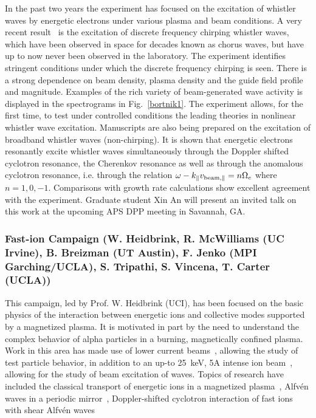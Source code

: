 \documentclass[11pt]{article}
\renewcommand{\cite}{\citep}
\begin{document}
In the past two years the experiment has focused on the excitation of
whistler waves by energetic electrons under various plasma and beam
conditions. A very recent result~\cite{vancompernolle:2015a} is the excitation
of discrete frequency chirping whistler waves, which have been observed
in space for decades known as chorus waves, but have up to now never
been observed in the laboratory. The experiment identifies stringent
conditions under which the discrete frequency chirping is seen. There is
a strong dependence on beam density, plasma density and the guide field
profile and magnitude. Examples of the rich variety of beam-generated
wave activity is displayed in the spectrograms in Fig.~\ref{bortnik1}. The
experiment allows, for the first time, to test under controlled
conditions the leading theories in nonlinear whistler wave excitation.
Manuscripts are also being prepared on the excitation of broadband
whistler waves (non-chirping). It is shown that energetic electrons
resonantly excite whistler waves simultaneously through the Doppler
shifted cyclotron resonance, the Cherenkov resonance as well as through
the anomalous cyclotron resonance, i.e. through the relation $\omega -
k_\parallel v_{{\rm beam}, \parallel} = n\Omega_{e}$ where
$n=1,0,-1$. Comparisons with
growth rate calculations show excellent agreement with the
experiment.  Graduate student Xin An will present an invited talk on
this work at the upcoming APS DPP meeting in Savannah, GA.

\subsubsection{Fast-ion Campaign (W. Heidbrink, R. McWilliams (UC Irvine), B.
Breizman (UT Austin), F. Jenko (MPI Garching/UCLA), S. Tripathi, S.
Vincena, T. Carter (UCLA))}

This campaign, led by Prof. W. Heidbrink (UCI), has been focused on the basic
physics of the interaction between energetic ions and collective modes
supported by a magnetized plasma. It is motivated in part by the need to
understand the complex behavior of alpha particles in a burning,
magnetically confined plasma.  Work in this area has made use of lower
current beams~\cite{zhang:2007}, allowing the study of test particle behavior, in
addition to an up-to 25~keV, 5A intense ion beam~\cite{tripathi:2011}, allowing for the
study of beam excitation of waves.    Topics of research have included
the classical transport of energetic ions in a magnetized
plasma~\cite{zhao:2005}, Alfv\'en waves in a periodic
mirror~\cite{zhang:2008a}, Doppler-shifted cyclotron interaction of
fast ions with shear Alfv\'{e}n waves~\cite{zhang:2008b,zhang:2009}
\end{document}
